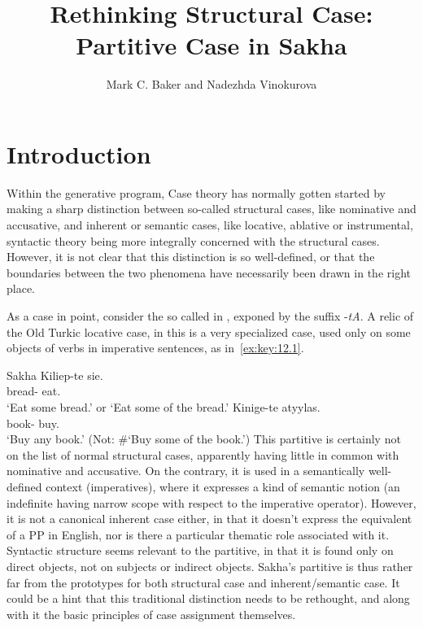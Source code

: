 \documentclass[output=paper]{langsci/langscibook}
\author{Mark C. Baker\affiliation{Rutgers University} and Nadezhda Vinokurova\affiliation{Institute for Humanities Research and Indigenous Studies of the North; Siberian Branch, Russian Academy of Sciences}}
\title{Rethinking Structural Case: Partitive Case in Sakha}
\begin{document}
\glsresetall
\maketitle

\section{Introduction}

Within the generative program, Case theory has normally gotten started by
making a sharp distinction between so-called structural cases, like nominative
and accusative, and inherent or semantic
cases, like locative, ablative or
instrumental, syntactic theory being more integrally concerned with the
structural cases. However, it is not clear that this distinction is so
well-defined, or that the boundaries between the two phenomena have necessarily
been drawn in the right place.

As a case in point, consider the so called  in , exponed by
the suffix -\emph{tA}. A relic of the Old Turkic locative case, in  this
is a very specialized case, used only on some objects of verbs in imperative
sentences, as in~\eqref{ex:key:12.1}.

\ea\label{ex:key:12.1}Sakha \parencite[421, 429]{StachowskiMenz1998}
	\ea
		\gll Kiliep-te  sie.\\
			bread-\Part{}  eat.\Imp{}\\
		\glt ‘Eat some bread.’ or ‘Eat some of the bread.’
	\ex
		\gll Kinige-te  atyylas.\\
			book-\Part{}  buy.\Imp{}\\
		\glt ‘Buy any book.’  (Not: \#‘Buy some of the book.’)
	\z
\z
This partitive is certainly not on the list of normal
structural cases, apparently having little in common with nominative and
accusative. On the contrary, it is used in a semantically
well-defined context (imperatives), where it expresses a kind of semantic
notion (an indefinite having narrow scope with respect to the
imperative operator). However, it is not a canonical
inherent
case either, in that it doesn’t express the equivalent of a PP in English, nor
is there a particular thematic role associated with it. Syntactic structure
seems relevant to the partitive, in that it is found only on
direct objects, not on subjects or indirect objects. Sakha’s
partitive is thus rather far from the prototypes for both
structural case and inherent/semantic case. It could be a hint that this
traditional distinction needs to be rethought, and along with it the basic
principles of case assignment themselves.
\end{document}
